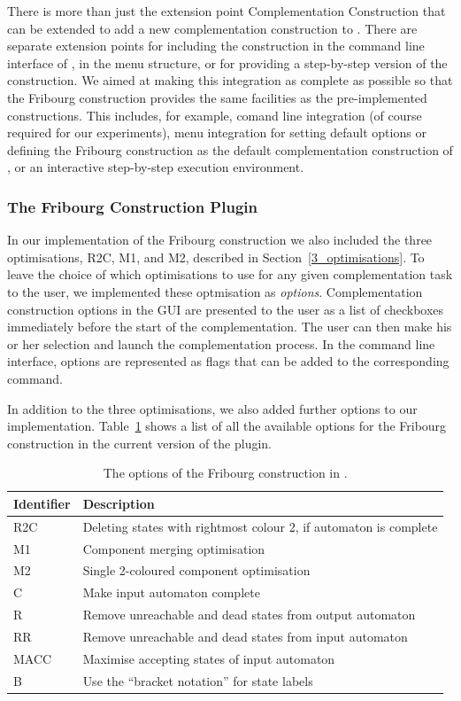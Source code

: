 There is more than just the extension point \textsf{Complementation Construction} that can be extended to add a new complementation construction to \goal. There are separate extension points for including the construction in the command line interface of \goal{}, in the menu structure, or for providing a step-by-step version of the construction. We aimed at making this integration as complete as possible so that the Fribourg construction provides the same facilities as the pre-implemented constructions. This includes, for example, comand line integration (of course required for our experiments), menu integration for setting default options or defining the Fribourg construction as the default complementation construction of \goal, or an interactive step-by-step execution environment.


\subsubsection{The Fribourg Construction Plugin}
In our implementation of the Fribourg construction we also included the three optimisations, R2C, M1, and M2, described in Section~\ref{3_optimisations}. To leave the choice of which optimisations to use for any given complementation task to the user, we implemented these optmisation as \textit{options}. Complementation construction options in the \goal{} GUI are presented to the user as a list of checkboxes immediately before the start of the complementation. The user can then make his or her selection and launch the complementation process. In the command line interface, options are represented as flags that can be added to the corresponding command.

In addition to the three optimisations, we also added further options to our implementation. Table~\ref{goal_options} shows a list of all the available options for the Fribourg construction in the current version of the plugin.


\begin{table}
\centering
\begin{tabular}{ll}
\hline
Identifier & Description \\
\hline
R2C & Deleting states with rightmost colour 2, if automaton is complete \\
M1 & Component merging optimisation \\
M2 & Single 2-coloured component optimisation \\
C & Make input automaton complete \\
R & Remove unreachable and dead states from output automaton \\
RR & Remove unreachable and dead states from input automaton \\
MACC & Maximise accepting states of input automaton \\
B & Use the ``bracket notation'' for state labels \\
\hline
\end{tabular}
\caption{The options of the Fribourg construction in \goal.}
\label{goal_options}
\end{table}

